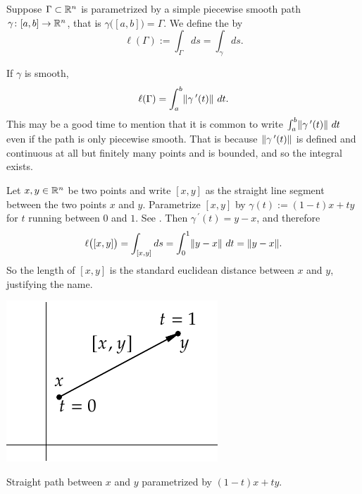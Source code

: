 \begin{defn}
Suppose $\Gamma \subset {\mathbb{R}}^n$ is parametrized by a simple
piecewise smooth path $\gamma \colon [a,b] \to {\mathbb{R}}^n$, that is
$\gamma\bigl( [a,b] \bigr) = \Gamma$.  We define the
\emph{} by
\begin{equation*}
\ell(\Gamma) := \int_{\Gamma} ds = \int_{\gamma} ds .
\end{equation*}
\end{defn}

If $\gamma$ is smooth,
\begin{equation*}
\ell(\Gamma) = 
\int_a^b
\lVert {\gamma^{\:\prime}(t)} \rVert~ dt .
\end{equation*}
This may be a good time to mention that it is common to write
$\int_a^b
\lVert {\gamma^{\:\prime}(t)} \rVert~ dt$ even if the path is only piecewise smooth.
That is because $\lVert {\gamma^{\:\prime}(t)} \rVert$ is defined and continuous
at all but finitely many points and is bounded, and so the integral exists.

\begin{example}
Let $x,y \in {\mathbb{R}}^n$ be two points and write $[x,y]$ as the straight line
segment between the two points $x$ and $y$.  Parametrize
$[x,y]$ by $\gamma(t) := (1-t)x + ty$ for $t$ running between $0$ and $1$.
See .
Then $\gamma^{\:\prime}(t) = y-x$, and therefore
\begin{equation*}
\ell\bigl([x,y]\bigr)
=
\int_{[x,y]} ds
=
\int_0^1 \lVert {y-x} \rVert ~ dt
=
\lVert {y-x} \rVert .
\end{equation*}
So the length of $[x,y]$ is the standard euclidean distance between $x$ and $y$,
justifying the name.
\begin{myfigureht}
\includegraphics{figures/straightpath}
\caption{Straight path between $x$ and $y$ parametrized
by $(1-t)x + ty$.\label{fig:straightpath}}
\end{myfigureht}
\end{example}


